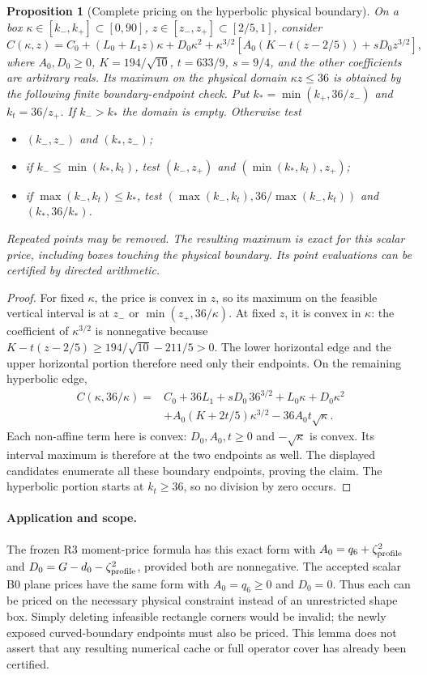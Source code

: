 \documentclass[11pt]{article}
\newtheorem{proposition}[theorem]{Proposition}
\begin{document}
\begin{proposition}[Complete pricing on the hyperbolic physical boundary]
\label{prop:new-curved-shape-price}
On a box $\kappa\in[k_-,k_+]\subset[0,90]$,
$z\in[z_-,z_+]\subset[2/5,1]$, consider
\[
 C(\kappa,z)=C_0+(L_0+L_1z)\kappa+D_0\kappa^2
 +\kappa^{3/2}\left[A_0(K-t(z-2/5))+sD_0z^{3/2}\right],
\]
where $A_0,D_0\geq0$, $K=194/\sqrt{10}$, $t=633/9$, $s=9/4$,
and the other coefficients are arbitrary reals.  Its maximum on the
physical domain $\kappa z\leq36$ is obtained by the following finite
boundary-endpoint check.
Put $k_* = \min(k_+,36/z_-)$ and $k_t=36/z_+$.
If $k_->k_*$ the domain is empty.  Otherwise test
\begin{itemize}
 \item $(k_-,z_-)$ and $(k_*,z_-)$;
 \item if $k_-\leq\min(k_*,k_t)$, test
       $(k_-,z_+)$ and $(\min(k_*,k_t),z_+)$;
 \item if $\max(k_-,k_t)\leq k_*$, test
       $(\max(k_-,k_t),36/\max(k_-,k_t))$
       and $(k_*,36/k_*)$.
\end{itemize}
Repeated points may be removed.  The resulting maximum is exact for
this scalar price, including boxes touching the physical boundary.
Its point evaluations can be certified by directed arithmetic.
\end{proposition}
\begin{proof}
For fixed $\kappa$, the price is convex in $z$, so its maximum on
the feasible vertical interval is at $z_-$ or
$\min(z_+,36/\kappa)$.  At fixed $z$, it is convex in $\kappa$:
the coefficient of $\kappa^{3/2}$ is nonnegative because
$K-t(z-2/5)\geq194/\sqrt{10}-211/5>0$.
The lower horizontal edge and the upper horizontal portion therefore
need only their endpoints.  On the remaining hyperbolic edge,
\begin{align*}
 C(\kappa,36/\kappa)={}&C_0+36L_1+sD_0\,36^{3/2}
 +L_0\kappa+D_0\kappa^2\\
 &+A_0(K+2t/5)\kappa^{3/2}-36A_0t\sqrt\kappa.
\end{align*}
Each non-affine term here is convex: $D_0,A_0,t\geq0$ and
$-\sqrt\kappa$ is convex.  Its interval maximum is therefore at
the two endpoints as well.  The displayed candidates enumerate all
these boundary endpoints, proving the claim.  The hyperbolic
portion starts at $k_t\geq36$, so no division by zero occurs.
\end{proof}

\paragraph{Application and scope.}
The frozen R3 moment-price formula has this exact form with
$A_0=q_6+\zeta_{\rm profile}^2$ and
$D_0=G-d_0-\zeta_{\rm profile}^2$, provided both are nonnegative.
The accepted scalar B0 plane prices have the same form with
$A_0=q_6\geq0$ and $D_0=0$.  Thus each can be priced on the
necessary physical constraint instead of an unrestricted shape box.
Simply deleting infeasible rectangle corners would be invalid;
the newly exposed curved-boundary endpoints must also be priced.
This lemma does not assert that any resulting numerical cache or
full operator cover has already been certified.
\end{document}
